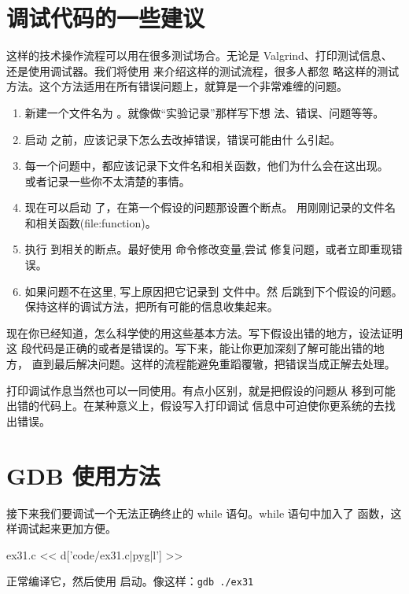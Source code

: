 \begin{enumerate}
\section{调试代码的一些建议}

这样的技术操作流程可以用在很多测试场合。无论是 Valgrind、打印测试信息、
还是使用调试器。我们将使用  来介绍这样的测试流程，很多人都忽
略这样的测试方法。这个方法适用在所有错误问题上，就算是一个非常难缠的问题。

\begin{enumerate}
\item 新建一个文件名为 。就像做“实验记录”那样写下想
  法、错误、问题等等。
\item 启动  之前，应该记录下怎么去改掉错误，错误可能由什
  么引起。
\item 每一个问题中，都应该记录下文件名和相关函数，他们为什么会在这出现。
  或者记录一些你不太清楚的事情。
\item 现在可以启动  了，在第一个假设的问题那设置个断点。
  用刚刚记录的文件名和相关函数(file:function)。
\item 执行  到相关的断点。最好使用  命令修改变量,尝试
  修复问题，或者立即重现错误。
\item 如果问题不在这里, 写上原因把它记录到  文件中。然
  后跳到下个假设的问题。保持这样的调试方法，把所有可能的信息收集起来。
\end{enumerate}


现在你已经知道，怎么科学使的用这些基本方法。写下假设出错的地方，设法证明这
段代码是正确的或者是错误的。写下来，能让你更加深刻了解可能出错的地方，
直到最后解决问题。这样的流程能避免重蹈覆辙，把错误当成正解去处理。

打印调试作息当然也可以一同使用。有点小区别，就是把假设的问题从
 移到可能出错的代码上。在某种意义上，假设写入打印调试
信息中可迫使你更系统的去找出错误。


\section{GDB 使用方法}

接下来我们要调试一个无法正确终止的 while 语句。while 语句中加入了
 函数，这样调试起来更加方便。

\begin{code}{ex31.c}
<< d['code/ex31.c|pyg|l'] >>
\end{code}

正常编译它，然后使用  启动。像这样：\verb|gdb ./ex31|


\end{enumerate}
